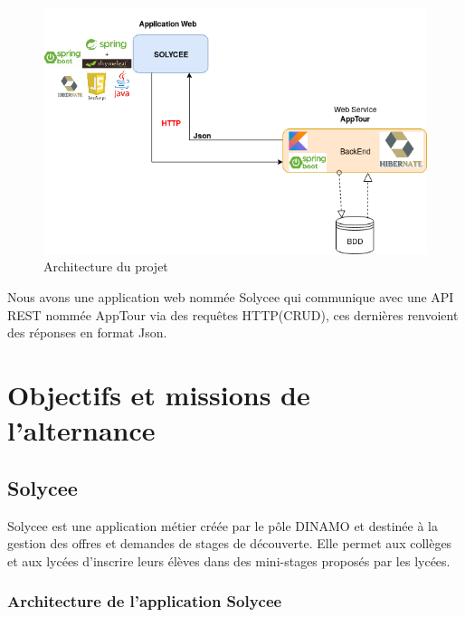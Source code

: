 \documentclass[12pt]{article}
\begin{document}
\begin{figure}[H]
	\centering
 		\includegraphics[width=1\textwidth]{diagrammes/ArchitectureGenerale.png}
  		\caption{Architecture du projet}
\end{figure}

Nous avons une application web nommée Solycee qui communique avec une API REST nommée AppTour via des requêtes HTTP(CRUD), ces dernières renvoient des réponses en format Json. 

\section{Objectifs et missions de l'alternance}

\subsection{Solycee}

Solycee est une application métier créée par le pôle DINAMO et destinée à la gestion des offres et demandes de stages de découverte. Elle permet aux collèges et aux lycées d'inscrire leurs élèves dans des mini-stages proposés par les lycées.  

 
\subsubsection{Architecture de l'application Solycee}
\end{document}
